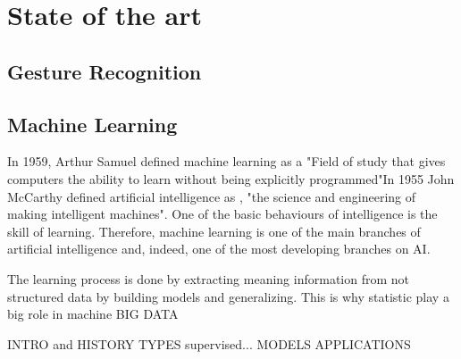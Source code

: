 
\chapter{State of the art}

\section{Gesture Recognition}

\section{Machine Learning}
In 1959, Arthur Samuel defined machine learning as a "Field of study that gives computers the ability to learn without being explicitly programmed"\cite{arthursamuel}In 1955 John McCarthy defined artificial intelligence as \cite{johnmccarthy}, "the science and engineering of making intelligent machines". One of the basic behaviours of intelligence is the skill of learning. Therefore, machine learning is one of the main branches of artificial intelligence and, indeed, one of the most  developing branches on AI.  

The learning process is done by extracting meaning information from not structured data by building models and generalizing. This is why statistic play a big role in machine
BIG DATA

INTRO and HISTORY
TYPES supervised...
MODELS
APPLICATIONS